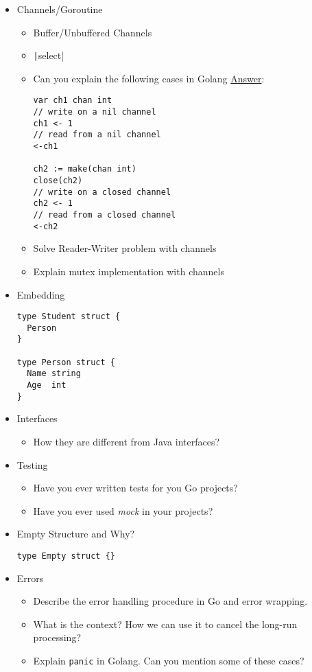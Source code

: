 \documentclass[]{book}
\begin{document}
\begin{itemize}
  \item Channels/Goroutine
    \begin{itemize}
      \item Buffer/Unbuffered Channels
      \item \texttt|select|
      \item Can you explain the following cases in Golang \href{https://stackoverflow.com/questions/39015602/how-does-a-non-initialized-channel-behave)}{Answer}:
        \begin{verbatim}
var ch1 chan int
// write on a nil channel
ch1 <- 1
// read from a nil channel
<-ch1

ch2 := make(chan int)
close(ch2)
// write on a closed channel
ch2 <- 1
// read from a closed channel
<-ch2
        \end{verbatim}
      \item Solve Reader-Writer problem with channels
      \item Explain mutex implementation with channels
    \end{itemize}

  \item Embedding
    \begin{verbatim}
type Student struct {
  Person
}

type Person struct {
  Name string
  Age  int
}
    \end{verbatim}

  \item Interfaces
    \begin{itemize}
      \item How they are different from Java interfaces?
    \end{itemize}

  \item Testing
    \begin{itemize}
      \item Have you ever written tests for you Go projects?
      \item Have you ever used \textit{mock} in your projects?
    \end{itemize}

  \item Empty Structure and Why?
    \begin{verbatim}
type Empty struct {}
    \end{verbatim}

  \item Errors
    \begin{itemize}
      \item  Describe the error handling procedure in Go and error wrapping.
      \item What is the context? How we can use it to cancel the long-run processing?
      \item Explain \texttt{panic} in Golang. Can you mention some of these cases?
    \end{itemize}


\end{itemize}
\end{document}

